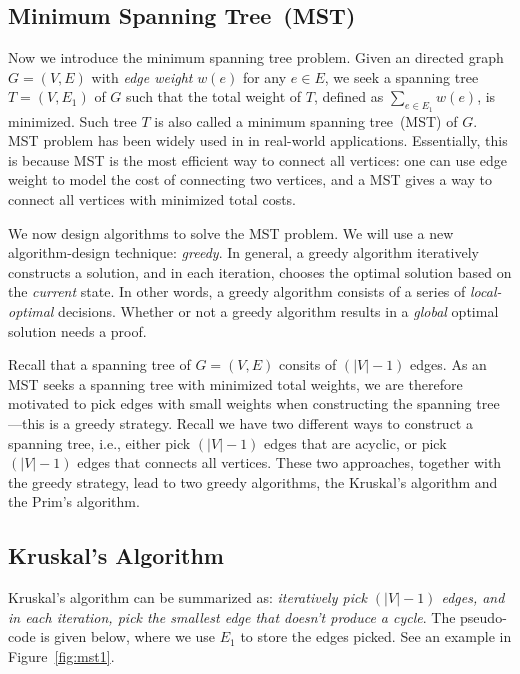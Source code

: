 \subsection*{Minimum Spanning Tree~(MST)}

Now we introduce the minimum spanning tree problem.
Given an directed graph $G = (V, E)$ with \emph{edge weight} $w(e)$ for any $e\in E$,
we seek a spanning tree $T = (V, E_1)$ of $G$ such that 
the total weight of $T$, defined as $\sum_{e\in E_1} w(e)$, is minimized.
Such tree $T$ is also called a minimum spanning tree~(MST) of $G$.
MST problem has been widely used in in real-world applications.
Essentially, this is because MST is the most efficient way to connect all
vertices: one can use edge weight to model the cost of connecting
two vertices, and a MST gives a way to connect all vertices with minimized total costs.

We now design algorithms to solve the MST problem.
We will use a new algorithm-design technique: \emph{greedy}.
In general, a greedy algorithm iteratively constructs a solution,
and in each iteration, chooses the optimal solution based on the \emph{current} state.
In other words, a greedy algorithm consists of a series of \emph{local-optimal} decisions.
Whether or not a greedy algorithm results in a \emph{global} optimal solution
needs a proof.

Recall that a spanning tree of $G = (V, E)$ consits of $(|V| - 1)$ edges.
As an MST seeks a spanning tree with minimized total weights,
we are therefore motivated to pick edges with small weights when constructing
the spanning tree---this is a greedy strategy.
Recall we have two different ways to construct a spanning tree, i.e., 
either pick $(|V|-1)$ edges that are acyclic,
or pick $(|V|-1)$ edges that connects all vertices.
These two approaches, together with the greedy strategy,
lead to two greedy algorithms, the Kruskal's algorithm and the Prim's algorithm.

\subsection*{Kruskal's Algorithm}

Kruskal's algorithm can be summarized as: \emph{iteratively pick $(|V|-1)$ edges,
and in each iteration, pick the smallest edge that doesn't produce a cycle}.
The pseudo-code is given below, where we use $E_1$ to store
the edges picked. See an example in Figure~\ref{fig:mst1}.

